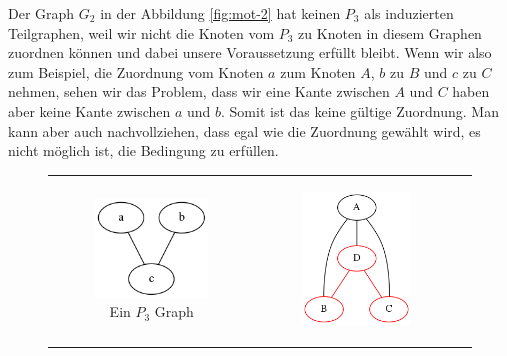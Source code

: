 \documentclass[12pt,a4paper,onecolumn,oneside,titlepage]{article}
\begin{document}
Der Graph $G_2$ in der Abbildung \ref{fig:mot-2} hat keinen $P_3$ als induzierten Teilgraphen, weil wir nicht die Knoten vom $P_3$ zu Knoten in diesem Graphen zuordnen können und dabei unsere Voraussetzung erfüllt bleibt. Wenn wir also zum Beispiel, die Zuordnung vom Knoten $a$ zum Knoten $A$, $b$ zu $B$ und $c$ zu $C$ nehmen, sehen wir das Problem, dass wir eine Kante zwischen $A$ und $C$ haben aber keine Kante zwischen $a$ und $b$. Somit ist das keine gültige Zuordnung. Man kann aber auch nachvollziehen, dass egal wie die Zuordnung gewählt wird, es nicht möglich ist, die Bedingung zu erfüllen.

\begin{figure}
  \centering
 
  \begin{tabular}[c]{ccc}
    \begin{subfigure}[b]{0.32\textwidth}
      \includegraphics[scale=0.6]{dot/dot_mot_p3.png}
   
      \caption{Ein $P_3$ Graph }
      \label{fig:mot-p3}
   \end{subfigure}&
	 \begin{subfigure}[b]{0.32\textwidth}
	 \includegraphics[scale=0.5]{dot/dot_mot_1.png}
	 

\end{subfigure}
\end{tabular}
\end{figure}
\end{document}
